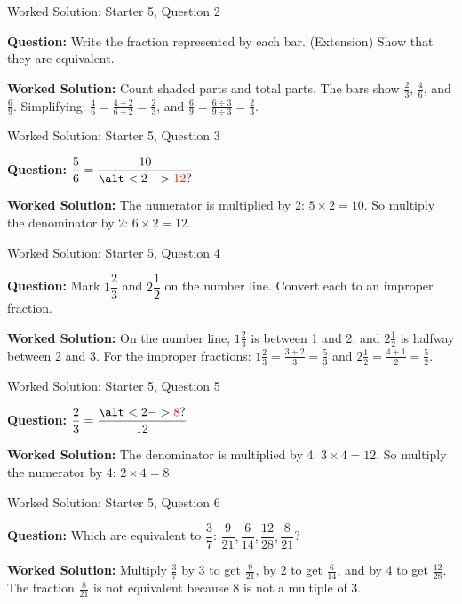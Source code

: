 \documentclass{beamer}
\newcommand{\ashow}[1]{\uncover<2->{\textcolor{red}{\small #1}}}
\newcommand{\ashowq}[1]{\alt<2->{\textcolor{red}{\small #1}}{?}}
\begin{document}
\begin{frame}{Worked Solution: Starter 5, Question 2}

\textbf{Question:} Write the fraction represented by each bar. (Extension) Show that they are equivalent.

\textbf{Worked Solution:} Count shaded parts and total parts. The bars show $\frac23$, $\frac46$, and $\frac69$. Simplifying: $\frac46 = \frac{4 \div 2}{6 \div 2} = \frac23$, and $\frac69 = \frac{6 \div 3}{9 \div 3} = \frac23$. \ashow{$\frac23=\frac46=\frac69$.}
\end{frame}

\begin{frame}{Worked Solution: Starter 5, Question 3}

\textbf{Question:} $\dfrac{5}{6}=\dfrac{10}{\ashowq{12}}$

\textbf{Worked Solution:} The numerator is multiplied by 2: $5 \times 2 = 10$. So multiply the denominator by 2: $6 \times 2 = 12$. \ashow{The missing denominator is 12.}
\end{frame}

\begin{frame}{Worked Solution: Starter 5, Question 4}

\textbf{Question:} Mark $1\dfrac{2}{3}$ and $2\dfrac{1}{2}$ on the number line. Convert each to an improper fraction.

\textbf{Worked Solution:} On the number line, $1\frac23$ is between 1 and 2, and $2\frac12$ is halfway between 2 and 3. For the improper fractions: $1\frac23 = \frac{3+2}{3} = \frac53$ and $2\frac12 = \frac{4+1}{2} = \frac52$. \ashow{$1\frac23=\frac53$, and $2\frac12=\frac52$.}
\end{frame}

\begin{frame}{Worked Solution: Starter 5, Question 5}

\textbf{Question:} $\dfrac{2}{3}=\dfrac{\ashowq{8}}{12}$

\textbf{Worked Solution:} The denominator is multiplied by 4: $3 \times 4 = 12$. So multiply the numerator by 4: $2 \times 4 = 8$. \ashow{The missing numerator is 8.}
\end{frame}

\begin{frame}{Worked Solution: Starter 5, Question 6}

\textbf{Question:} Which are equivalent to $\dfrac{3}{7}$: $\dfrac{9}{21}, \dfrac{6}{14}, \dfrac{12}{28}, \dfrac{8}{21}$?

\textbf{Worked Solution:} Multiply $\frac37$ by 3 to get $\frac{9}{21}$, by 2 to get $\frac{6}{14}$, and by 4 to get $\frac{12}{28}$. The fraction $\frac{8}{21}$ is not equivalent because $8$ is not a multiple of $3$. \ashow{$\frac{9}{21},\ \frac{6}{14},\ \frac{12}{28}$.}
\end{frame}
\end{document}
